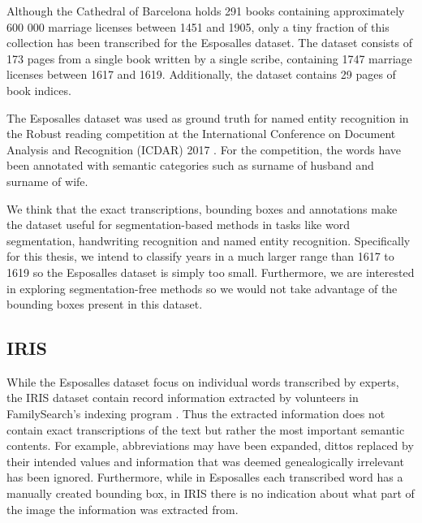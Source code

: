 Although the Cathedral of Barcelona holds 291 books containing approximately 600 000 marriage licenses between 1451 and 1905, only a tiny fraction of this collection has been transcribed for the Esposalles dataset. The dataset consists of 173 pages from a single book written by a single scribe, containing 1747 marriage licenses between 1617 and 1619. Additionally, the dataset contains 29 pages of book indices.

The Esposalles dataset was used as ground truth for named entity recognition in the Robust reading competition at the International Conference on Document Analysis and Recognition (ICDAR) 2017 \cite{EsposallesCompetition}. For the competition, the words have been annotated with semantic categories such as surname of husband and surname of wife.

We think that the exact transcriptions, bounding boxes and annotations make the dataset useful for segmentation-based methods in tasks like word segmentation, handwriting recognition and named entity recognition.
Specifically for this thesis, we intend to classify years in a much larger range than 1617 to 1619 so the Esposalles dataset is simply too small. Furthermore, we are interested in exploring segmentation-free methods so we would not take advantage of the bounding boxes present in this dataset.




\subsection{IRIS}

While the Esposalles dataset focus on individual words transcribed by experts, the IRIS dataset contain record information extracted by volunteers in FamilySearch's indexing program \cite{Iris}.
Thus the extracted information does not contain exact transcriptions of the text but rather the most important semantic contents.
For example, abbreviations may have been expanded, dittos replaced by their intended values and information that was deemed genealogically irrelevant has been ignored.
Furthermore, while in Esposalles each transcribed word has a manually created bounding box, in IRIS there is no indication about what part of the image the information was extracted from.

